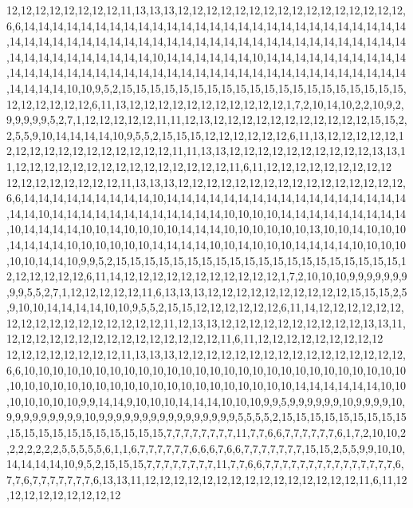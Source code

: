 12,12,12,12,12,12,12,12,11,13,13,13,12,12,12,12,12,12,12,12,12,12,12,12,12,12,12,12,6,6,14,14,14,14,14,14,14,14,14,14,14,14,14,14,14,14,14,14,14,14,14,14,14,14,14,14,14,14,14,14,14,14,14,14,14,14,14,14,14,14,14,14,14,14,14,14,14,14,14,14,14,14,14,14,14,14,14,14,14,14,14,14,14,14,14,10,14,14,14,14,14,14,10,14,14,14,14,14,14,14,14,14,14,14,14,14,14,14,14,14,14,14,14,14,14,14,14,14,14,14,14,14,14,14,14,14,14,14,14,14,14,14,14,14,14,10,10,9,5,2,15,15,15,15,15,15,15,15,15,15,15,15,15,15,15,15,15,15,15,15,12,12,12,12,12,12,6,11,13,12,12,12,12,12,12,12,12,12,12,12,1,7,2,10,14,10,2,2,10,9,2,9,9,9,9,9,5,2,7,1,12,12,12,12,12,11,11,12,13,12,12,12,12,12,12,12,12,12,12,12,15,15,2,2,5,5,9,10,14,14,14,14,10,9,5,5,2,15,15,15,12,12,12,12,12,12,6,11,13,12,12,12,12,12,12,12,12,12,12,12,12,12,12,12,12,12,11,11,13,13,12,12,12,12,12,12,12,12,12,12,13,13,11,12,12,12,12,12,12,12,12,12,12,12,12,12,12,12,11,6,11,12,12,12,12,12,12,12,12,12
12,12,12,12,12,12,12,12,11,13,13,13,12,12,12,12,12,12,12,12,12,12,12,12,12,12,12,12,6,6,14,14,14,14,14,14,14,14,14,10,14,14,14,14,14,14,14,14,14,14,14,14,14,14,14,14,14,14,14,10,14,14,14,14,14,14,14,14,14,14,14,14,10,10,10,10,14,14,14,14,14,14,14,14,14,10,14,14,14,14,10,10,14,10,10,10,10,14,14,14,10,10,10,10,10,10,13,10,10,14,10,10,10,14,14,14,14,10,10,10,10,10,10,14,14,14,14,10,10,14,10,10,10,14,14,14,14,10,10,10,10,10,10,14,14,10,9,9,5,2,15,15,15,15,15,15,15,15,15,15,15,15,15,15,15,15,15,15,15,15,12,12,12,12,12,12,6,11,14,12,12,12,12,12,12,12,12,12,12,12,1,7,2,10,10,10,9,9,9,9,9,9,9,9,9,5,5,2,7,1,12,12,12,12,12,11,6,13,13,13,12,12,12,12,12,12,12,12,12,12,15,15,15,2,5,9,10,10,14,14,14,14,10,10,9,5,5,2,15,15,12,12,12,12,12,12,6,11,14,12,12,12,12,12,12,12,12,12,12,12,12,12,12,12,12,12,11,12,13,13,12,12,12,12,12,12,12,12,12,12,13,13,11,12,12,12,12,12,12,12,12,12,12,12,12,12,12,12,11,6,11,12,12,12,12,12,12,12,12,12
12,12,12,12,12,12,12,12,11,13,13,13,12,12,12,12,12,12,12,12,12,12,12,12,12,12,12,12,6,6,10,10,10,10,10,10,10,10,10,10,10,10,10,10,10,10,10,10,10,10,10,10,10,10,10,10,10,10,10,10,10,10,10,10,10,10,10,10,10,10,10,10,10,10,10,10,10,14,14,14,14,14,14,10,10,10,10,10,10,10,9,9,14,14,9,10,10,10,14,14,14,10,10,10,9,9,5,9,9,9,9,9,9,10,9,9,9,9,10,9,9,9,9,9,9,9,9,9,10,9,9,9,9,9,9,9,9,9,9,9,9,9,9,9,9,5,5,5,5,2,15,15,15,15,15,15,15,15,15,15,15,15,15,15,15,15,15,15,15,15,7,7,7,7,7,7,7,7,11,7,7,6,6,7,7,7,7,7,7,6,1,7,2,10,10,2,2,2,2,2,2,2,5,5,5,5,5,6,1,1,6,7,7,7,7,7,7,6,6,6,7,6,6,7,7,7,7,7,7,7,15,15,2,5,5,9,9,10,10,14,14,14,14,10,9,5,2,15,15,15,7,7,7,7,7,7,7,7,11,7,7,6,6,7,7,7,7,7,7,7,7,7,7,7,7,7,7,7,6,7,7,6,7,7,7,7,7,7,7,6,13,13,11,12,12,12,12,12,12,12,12,12,12,12,12,12,12,12,11,6,11,12,12,12,12,12,12,12,12,12
